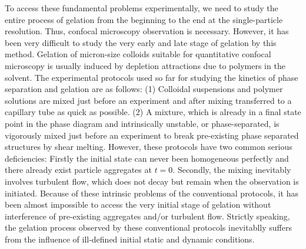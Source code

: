 \documentclass[preprint,footinbib,amsmath,amssymb,superscriptaddress]{revtex4}
\begin{document}
To access these fundamental problems experimentally, we need to study the entire process of gelation from the beginning to the end at the single-particle resolution. 
Thus, confocal microscopy observation is necessary. However, it has been very difficult to study the very early and late stage of gelation by this method. 
Gelation of micron-size colloids suitable for quantitative confocal microscopy is usually induced by depletion attractions due to polymers in the solvent. 
The experimental protocols used so far for studying the kinetics of phase separation and gelation are as follows: (1) Colloidal suspensions and polymer solutions are mixed just before an experiment and after mixing transferred to a capillary tube as quick as possible. 
(2) A mixture, which is already in a final state point in the phase diagram and intrinsically unstable, or phase-separated, is vigorously mixed just before an experiment to break pre-existing phase separated structures by shear melting. 
However, these protocols have two common serious deficiencies: Firstly the initial state can never been homogeneous perfectly and there already exist particle aggregates at $t=0$. Secondly, the mixing inevitably involves 
turbulent flow, which does not decay but remain when the observation is initiated. 
Because of these intrinsic problems of the conventional protocols, it has been almost impossible to access the very initial stage of gelation without interference of pre-existing aggregates and/or turbulent flow.  
Strictly speaking, the gelation process observed by these conventional protocols inevitablly suffers from the influence of ill-defined initial static and dynamic conditions. 
\end{document}
